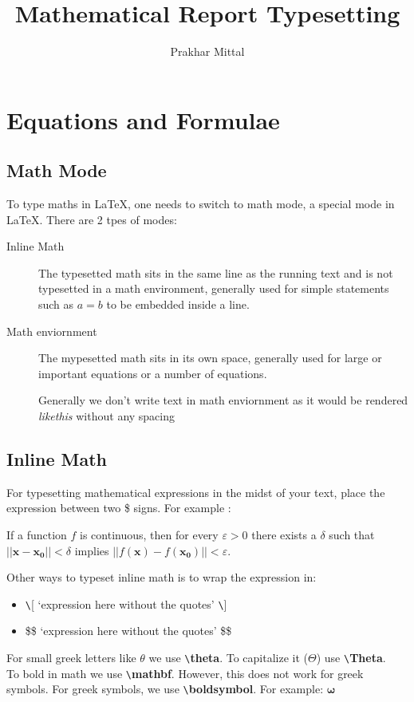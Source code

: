 \documentclass[12pt, letterpaper]{article}
\title{Mathematical Report Typesetting}
\author{Prakhar Mittal}
\theoremstyle{remark}
\begin{document}
\maketitle
\tableofcontents
\clearpage

\section{Equations and Formulae}
    \subsection{Math Mode}
    To type maths in \LaTeX{}, one needs to switch to math mode, a special mode in \LaTeX.
    There are 2 tpes of modes: 

    \begin{description}
        \item[Inline Math] The typesetted math sits in the same line as the running text
        and is not typesetted in a math environment, generally used for simple statements
        such as $a=b$ to be embedded inside a line.
        \item[Math enviornment] The mypesetted math sits in its own space,
        generally used for large or important equations or a number of equations.
        
        Generally we don't write text in math enviornment as it would be rendered \textit{likethis}
        without any spacing
    \end{description}

    \subsection{Inline Math}
    For typesetting mathematical expressions in the midst of your text,
    place the expression between two \$ signs. For example :

    If a function $f$ is continuous, then for every $\varepsilon > 0$ there 
    exists a $\delta$ such that $||\mathbf{x}-\mathbf{x_0}|| < \delta$ implies
    $||f(\mathbf{x})-f(\mathbf{x_0})|| < \varepsilon$.\footnotemark

    Other ways to typeset inline math is to wrap the expression in:
    \begin{itemize}
        \item \verb!\![  `expression here without the quotes' \verb!\!]
        \item \$\$ `expression here without the quotes' \$\$
    \end{itemize}  
    For small greek letters like $\theta$ we use \verb!\!\textbf{theta}. To capitalize it ($\Theta$) use \verb!\!\textbf{Theta}. \\
    To bold in math we use \verb!\!\textbf{mathbf}. However, this does not work for greek symbols.
    For greek symbols, we use \verb!\!\textbf{boldsymbol}. For example: $\boldsymbol{\omega}$ 
\end{document}
